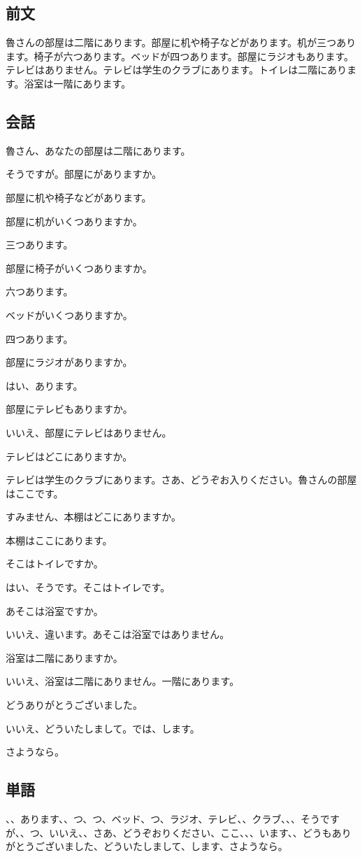 \documentclass[a5j]{ltjtarticle}
\newcommand*{\Rospeaks}{\item[魯]}
\newcommand*{\Lispeaks}{\item[李]}
\begin{document}
\subsection*{前文}

魯さんの部屋は二階にあります。部屋に机や椅子などがあります。机が三つあります。椅子が六つあります。ベッドが四つあります。部屋にラジオもあります。テレビはありません。テレビは学生のクラブにあります。トイレは二階にあります。浴室は一階にあります。

\subsection*{会話}

\begin{dialogue}
  \Lispeaks 魯さん、あなたの部屋は二階にあります。
  \Rospeaks そうですが。部屋にがありますか。
  \Lispeaks 部屋に机や椅子などがあります。
  \Rospeaks 部屋に机がいくつありますか。
  \Lispeaks 三つあります。
  \Rospeaks 部屋に椅子がいくつありますか。
  \Lispeaks 六つあります。
  \Rospeaks ベッドがいくつありますか。
  \Lispeaks 四つあります。
  \Rospeaks 部屋にラジオがありますか。
  \Lispeaks はい、あります。
  \Rospeaks 部屋にテレビもありますか。
  \Lispeaks いいえ、部屋にテレビはありません。
  \Rospeaks テレビはどこにありますか。
  \Lispeaks テレビは学生のクラブにあります。さあ、どうぞお入りください。魯さんの部屋はここです。
  \Rospeaks すみません、本棚はどこにありますか。
  \Lispeaks 本棚はここにあります。
  \Rospeaks そこはトイレですか。
  \Lispeaks はい、そうです。そこはトイレです。
  \Rospeaks あそこは浴室ですか。
  \Lispeaks いいえ、違います。あそこは浴室ではありません。
  \Rospeaks 浴室は二階にありますか。
  \Lispeaks いいえ、浴室は二階にありません。一階にあります。
  \Rospeaks {}どうありがとうございました。
  \Lispeaks いいえ、どういたしまして。では、します。
  \Rospeaks さようなら。
\end{dialogue}

\subsection*{単語}

\begin{onehalfspace}
  、、あります、、つ、つ、ベッド、つ、ラジオ、テレビ、、クラブ、、、そうですが、、つ、いいえ、、さあ、どうぞおりください、ここ、、、います、、どうもありがとうございました、どういたしまして、します、さようなら。
\end{onehalfspace}
\end{document}

